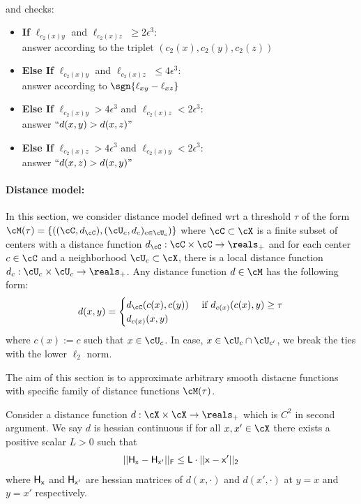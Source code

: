 \begin{algorithm}[t]
\begin{gather*}
\end{gather*}
and checks:
\begin{itemize}
    \item \textbf{If} $\ell_{c_2(x)y}$ and $\ell_{c_2(x)z}$ $\ge 2\epsilon^3$: \\
        \qquad answer according to the triplet $(c_2(x),c_2(y),c_2(z))$
    \item \textbf{Else If} $\ell_{c_2(x)y}$ and $\ell_{c_2(x)z}$ $ \le  4\epsilon^3$:\\
        \qquad answer according to $\sgn{\ell_{xy} - \ell_{xz}}$
    \item \textbf{Else If} $\ell_{c_2(x)y} > 4\epsilon^3$ and $\ell_{c_2(x)z} < 2\epsilon^3$:\\
    \qquad answer $``d(x,y) > d(x,z)"$
    \item \textbf{Else If} $\ell_{c_2(x)z} > 4\epsilon^3$ and $\ell_{c_2(x)y} < 2\epsilon^3$:\\ 
    \qquad answer $``d(x,z) > d(x,y)"$
    
\end{itemize}
\end{algorithm}
\paragraph{Distance model:} In this section, we consider distance model defined wrt a threshold $\tau$ of the form $\cM(\tau) = \{((\cC, d_{\cC}), (\cU_c, d_c)_{c \in \cU_c})\}$ where $\cC \subset \cX$ is a finite subset of centers with a distance function $d_{\cC}: \cC \times \cC \to \reals_{+}$ and for each center $c \in \cC$ and a neighborhood $\cU_c \subset \cX$, there is a local distance function $d_c: \cU_c \times \cU_c \to \reals_{+}$. Any distance function $d \in \cM$ has the following form:
\begin{align*}
    d(x,y) = \begin{cases}
        d_{\cC}(c(x), c(y)) & \textnormal{ if } d_{c(x)}(c(x), y) \ge \tau\\
        d_{c(x)}(x,y)
    \end{cases}
\end{align*}
where $c(x) := c$ such that $x \in \cU_c$. In case, $x \in \cU_c \cap \cU_{c'}$, we break the ties with the lower $\ell_2$ norm.

The aim of this section is to approximate arbitrary smooth distacne functions with specific family of distance functions $\cM(\tau)$.

\begin{assumption} Consider a distance function $d: \cX \times \cX \to \reals_{+}$ which is $C^2$ in second argument. We say $d$ is hessian continuous if for all $x, x' \in \cX$ there exists a positive scalar $L > 0$ such that 
\begin{align*}
    ||\sf{H}_x - \sf{H}_{x'}||_{F} \le L\cdot ||x - x'||_2
\end{align*}
where $\sf{H}_x$ and $\sf{H}_{x'}$ are hessian matrices of $d(x,\cdot)$ and $d(x',\cdot)$ at $y = x$ and $y = x'$ respectively.
\end{assumption}

